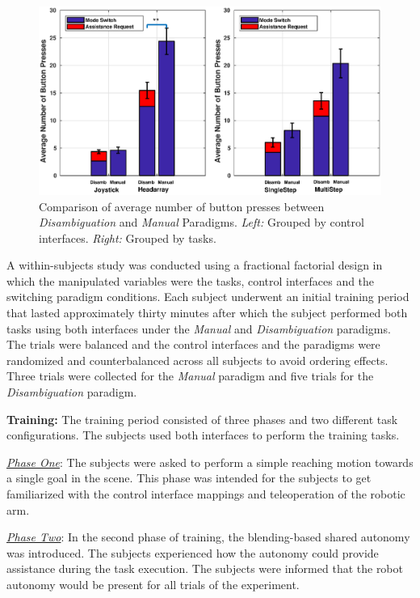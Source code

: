 \begin{figure}[ht!]
	\centering
	\includegraphics[keepaspectratio, width = 0.9\hsize ,center]{./figures/button_press_combined_shrunk.eps}
	\caption{Comparison of average number of button presses between \textit{Disambiguation} and \textit{Manual} Paradigms. \textit{Left:} Grouped by control interfaces. \textit{Right:} Grouped by tasks.}
	\label{fig:button_press}
\end{figure}
A within-subjects study was conducted using a fractional factorial design in which the manipulated variables were the tasks, control interfaces and the switching paradigm conditions. Each subject underwent an initial training period that lasted approximately thirty minutes after which the subject performed both tasks using both interfaces under the \textit{Manual} and \textit{Disambiguation} paradigms. The trials were balanced and the control interfaces and the paradigms were randomized and counterbalanced across all subjects to avoid ordering effects. Three trials were collected for the \textit{Manual} paradigm and five trials for the \textit{Disambiguation} paradigm. 

\textbf{Training:} The training period consisted of three phases and two different task configurations. The subjects used both interfaces to perform the training tasks.

\noindent\underline{\textit{Phase One}}: The subjects were asked to perform a simple reaching motion towards a single goal in the scene. This phase was intended for the subjects to get familiarized with the control interface mappings and teleoperation of the robotic arm. 

\noindent\underline{\textit{Phase Two}}: In the second phase of training, the blending-based shared autonomy was introduced. The subjects experienced how the autonomy could provide assistance during the task execution. The subjects were informed that the robot autonomy would be present for all trials of the experiment. 

